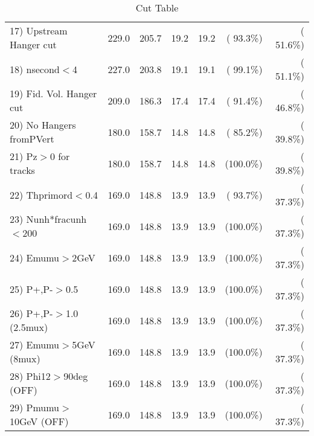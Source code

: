 \begin{table}[h!]
\begin{tabular}{||l||r|r|r|r|r|r||}
 17) Upstream Hanger cut  &        229.0 &        205.7 &         19.2 &         19.2 & ( 93.3\%) & ( 51.6\%) \\
 18) nsecond$<$4          &        227.0 &        203.8 &         19.1 &         19.1 & ( 99.1\%) & ( 51.1\%) \\
 19) Fid. Vol. Hanger cut &        209.0 &        186.3 &         17.4 &         17.4 & ( 91.4\%) & ( 46.8\%) \\
 20) No Hangers fromPVert &        180.0 &        158.7 &         14.8 &         14.8 & ( 85.2\%) & ( 39.8\%) \\
 21) Pz$>$0 for tracks    &        180.0 &        158.7 &         14.8 &         14.8 & (100.0\%) & ( 39.8\%) \\
 22) Thprimord$<$0.4      &        169.0 &        148.8 &         13.9 &         13.9 & ( 93.7\%) & ( 37.3\%) \\
 23) Nunh*fracunh$<$200   &        169.0 &        148.8 &         13.9 &         13.9 & (100.0\%) & ( 37.3\%) \\
 24) Emumu$>$2GeV         &        169.0 &        148.8 &         13.9 &         13.9 & (100.0\%) & ( 37.3\%) \\
 25) P+,P-$>$0.5          &        169.0 &        148.8 &         13.9 &         13.9 & (100.0\%) & ( 37.3\%) \\
 26) P+,P-$>$1.0 (2.5mux) &        169.0 &        148.8 &         13.9 &         13.9 & (100.0\%) & ( 37.3\%) \\
 27) Emumu$>$5GeV  (8mux) &        169.0 &        148.8 &         13.9 &         13.9 & (100.0\%) & ( 37.3\%) \\
 28) Phi12$>$90deg  (OFF) &        169.0 &        148.8 &         13.9 &         13.9 & (100.0\%) & ( 37.3\%) \\
 29) Pmumu$>$10GeV  (OFF) &        169.0 &        148.8 &         13.9 &         13.9 & (100.0\%) & ( 37.3\%) \\
 \hline
 \hline
 \end{tabular}
 \caption{Cut Table           }
 \label{tab-cutcohjpsi-mumu_anumucc}
 \end{table}
